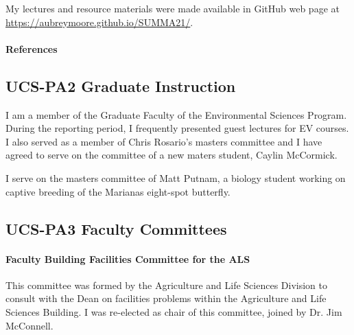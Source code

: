 \begin{refsection}
My lectures and resource materials were made available in GitHub web page at \url{https://aubreymoore.github.io/SUMMA21/}.
\begin{comment}
\paragraph{Plans for 14JUN2021-15JUN2022}

I will teach AL/BI 345, General Entomology, lecture and laboratory sections, during Fall Term 2021.

\paragraph{Plans for 14JUN2022-15JUN2023}

None.
\end{comment}
\paragraph{References}
\printbibliography[heading=none]
\end{refsection}

\subsection{UCS-PA2 Graduate Instruction}

I am a member of the Graduate Faculty of the Environmental Sciences Program. During the reporting period, I frequently presented guest lectures for EV courses. I also served as a member of Chris Rosario's masters committee and I have agreed to serve on the committee of a new maters student, Caylin McCormick.

I serve on the masters committee of Matt Putnam, a biology student working on captive breeding of the Marianas eight-spot butterfly. 

\subsection{UCS-PA3 Faculty Committees}

\paragraph{Faculty Building Facilities Committee for the ALS}

This committee was formed by the Agriculture and Life Sciences Division
to consult with the Dean on facilities problems within the Agriculture
and Life Sciences Building. I was re-elected as chair of this committee, joined by Dr. Jim McConnell.

